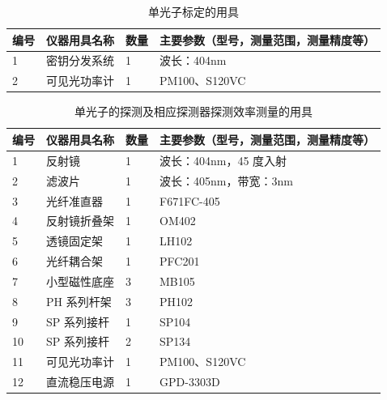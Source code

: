 \begin{table}[htbp]
	\centering
	\renewcommand\arraystretch{1.6}
	\caption{单光子标定的用具}
	\begin{tabular}{p{}|p{}|p{}|p{}}
		\hline
		编号& 仪器用具名称 & 数量 &  主要参数（型号，测量范围，测量精度等） \\
		\hline
		1	&	密钥分发系统 	& 1 & 波长：404nm	\\
		
		2	&	可见光功率计 	& 1 & PM100、S120VC	 \\
		\hline
	\end{tabular}
\end{table}

\begin{table}[htbp]
	\centering
	\renewcommand\arraystretch{1.6}
	\caption{单光子的探测及相应探测器探测效率测量的用具}
	\begin{tabular}{p{}|p{}|p{}|p{}}
		\hline
		编号& 仪器用具名称 & 数量 &  主要参数（型号，测量范围，测量精度等） \\
		\hline
		1	&	反射镜 	& 1 & 波长：404nm，45 度入射	\\
		
		2	&	滤波片 	& 1 & 波长：405nm，带宽：3nm	 \\
		
		3	&	光纤准直器 & 1 &	F671FC-405 	\\
		
		4	&	反射镜折叠架	& 1 & OM402	\\
		
		5	&	透镜固定架	& 1 & LH102	\\
		
		6	&	光纤耦合架	& 1 & PFC201 \\
		
		7	&	小型磁性底座	& 3 & MB105	\\
		
		8	&	PH 系列杆架	& 3 & PH102	\\
		
		9	&	SP 系列接杆	& 1 & SP104	\\
		
		10	&	SP 系列接杆	& 2	& SP134	\\
		
		11	&	可见光功率计	& 1 & PM100、S120VC	\\
		
		12	&	直流稳压电源& 1 & GPD-3303D	\\
		\hline
	\end{tabular}
\end{table}


